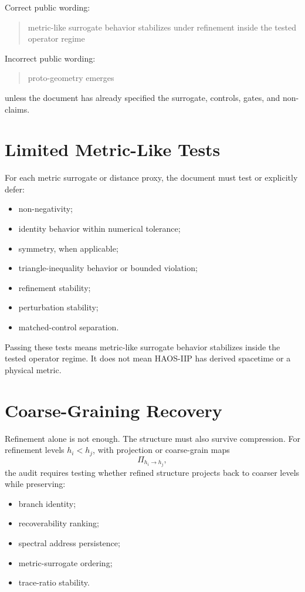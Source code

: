 \documentclass[11pt]{article}
\begin{document}
Correct public wording:
\begin{quote}
metric-like surrogate behavior stabilizes under refinement inside the tested operator regime
\end{quote}

Incorrect public wording:
\begin{quote}
proto-geometry emerges
\end{quote}

unless the document has already specified the surrogate, controls, gates, and non-claims.

\section{Limited Metric-Like Tests}

For each metric surrogate or distance proxy, the document must test or explicitly defer:
\begin{itemize}
\item non-negativity;
\item identity behavior within numerical tolerance;
\item symmetry, when applicable;
\item triangle-inequality behavior or bounded violation;
\item refinement stability;
\item perturbation stability;
\item matched-control separation.
\end{itemize}

Passing these tests means metric-like surrogate behavior stabilizes inside the tested operator regime. It does not mean HAOS-IIP has derived spacetime or a physical metric.

\section{Coarse-Graining Recovery}

Refinement alone is not enough. The structure must also survive compression. For refinement levels \(h_i<h_j\), with projection or coarse-grain maps
\[
\Pi_{h_i\rightarrow h_j},
\]
the audit requires testing whether refined structure projects back to coarser levels while preserving:
\begin{itemize}
\item branch identity;
\item recoverability ranking;
\item spectral address persistence;
\item metric-surrogate ordering;
\item trace-ratio stability.
\end{itemize}
\end{document}
